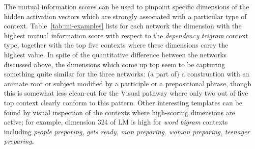 The mutual information scores can be used to pinpoint specific
dimensions of the hidden activation vectors which are strongly
associated with a particular type of
context. Table~\ref{tab:mi-examples} lists for each network the
dimension with the highest mutual information score with respect to
the {\it dependency trigram} context type, together with the top
five contexts where these dimensions carry the highest value. In spite
of the quantitative difference between the networks discussed above,
the dimensions which come up top seem to be capturing something quite
similar for the three networks: (a part of) a construction with an
animate root or subject modified by a participle or a prepositional
phrase, though this is somewhat less clean-cut for the {\sc Visual}
pathway where only two out of five top context clearly conform to this
pattern.  Other interesting templates can be found by visual
inspection of the contexts where high-scoring dimensions are active;
for example, dimension 324 of {\sc LM} is high for {\it word bigram} 
contexts including
{\it people preparing, gets ready, man preparing, woman preparing,
  teenager preparing}.


